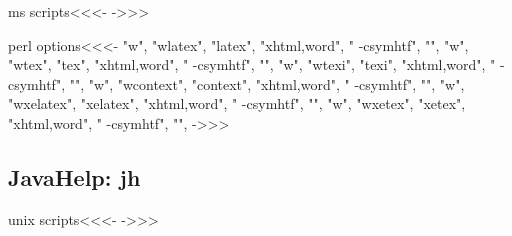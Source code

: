 \documentclass{article}
\begin{document}
\<ms scripts\><<<-
->>>




\<perl options\><<<-
 "w", "wlatex",   "latex",   "xhtml,word", " -csymhtf", "",
 "w", "wtex",     "tex",     "xhtml,word", " -csymhtf", "",
 "w", "wtexi",    "texi",    "xhtml,word", " -csymhtf", "",
 "w", "wcontext", "context", "xhtml,word", " -csymhtf", "",
 "w", "wxelatex",   "xelatex",   "xhtml,word", " -csymhtf", "",
 "w", "wxetex",     "xetex",     "xhtml,word", " -csymhtf", "",
->>>




\subsection{JavaHelp: jh}

\<unix scripts\><<<-
->>>
\end{document}
